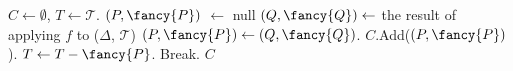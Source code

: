 %
 \begin{algorithm}[H]
    \caption{\texttt{k\_means}(\texttt{vector} $(c_1, c_2, c_3)$, \texttt{trajectory} $\mathcal{T}$, \texttt{subroutine} $f$) }
    \label{alg:k-means}
    \begin{algorithmic}
    \State $C \gets \emptyset$, $T \gets \mathcal{T}$.
    \State $(P, {\fancy{P}}) $ $\gets$ null
    \State $(Q, {\fancy{Q}}) \gets $ the result of applying $f$ to ($\Delta$, $\mathcal{T}$)
    \State $(P, {\fancy{P}}) \gets (Q, {\fancy{Q}})$. 
    \EndIf
    \EndFor
    \State $C$.Add($(P, {\fancy{P}})$).
    \State $T \gets T - {\fancy{P}}$.
    \Else
    \State Break.
    \EndIf
    \EndWhile
    \State \Return $C$
    \end{algorithmic}
  \end{algorithm}
%
%
%
%
\clearpage
